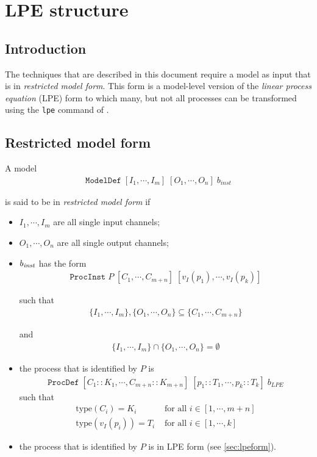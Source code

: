 \chapter{LPE structure}

\section{Introduction}
The techniques that are described in this document require a \txs{} model as input that is in \emph{restricted model form}.
This form is a model-level version of the \emph{linear process equation} (LPE) form to which many, but not all \txs{} processes can be transformed using the \texttt{lpe} command of \txs{}.

\section{Restricted model form} \label{sec:restrictedmodelform}

A \txs{} model
\begin{align*}
\texttt{ModelDef} \; [I_1, \cdots{}, I_m] \; [O_1, \cdots{}, O_n] \; b_\textit{inst}
\end{align*}

is said to be in \emph{restricted model form} if

\begin{itemize}
\item $I_1, \cdots{}, I_m$ are all single input channels;
\item $O_1, \cdots{}, O_n$ are all single output channels;
\item $b_\text{\textit{inst}}$ has the form
\begin{align*}
\texttt{ProcInst} \; P \; [C_1, \cdots{}, C_{m+n}] \; [v_I(p_1), \cdots{}, v_I(p_k)]
\end{align*}

such that
\begin{align*}
\{ I_1, \cdots{}, I_m \}, \{ O_1, \cdots{}, O_n \} \subseteq \{ C_1, \cdots{}, C_{m+n} \}
\end{align*}

and
\begin{align*}
\{ I_1, \cdots{}, I_m \} \cap \{ O_1, \cdots{}, O_n \} = \emptyset{}
\end{align*}

\item the \txs{} process that is identified by $P$ is
\begin{align*}
\texttt{ProcDef} \; [C_1 :: K_1, \cdots{}, C_{m+n} :: K_{m+n}] \; [p_1 :: T_1, \cdots{}, p_k :: T_k] \; b_\textit{LPE}
\end{align*}
such that
\begin{align*}
\text{type}(C_i) = K_i &\text{ for all } i \in [1, \cdots{}, m+n] \\
\text{type}(v_I(p_i)) = T_i &\text{ for all } i \in [1, \cdots{}, k]
\end{align*}

\item the \txs{} process that is identified by $P$ is in LPE form (see \ref{sec:lpeform}).
\end{itemize}

